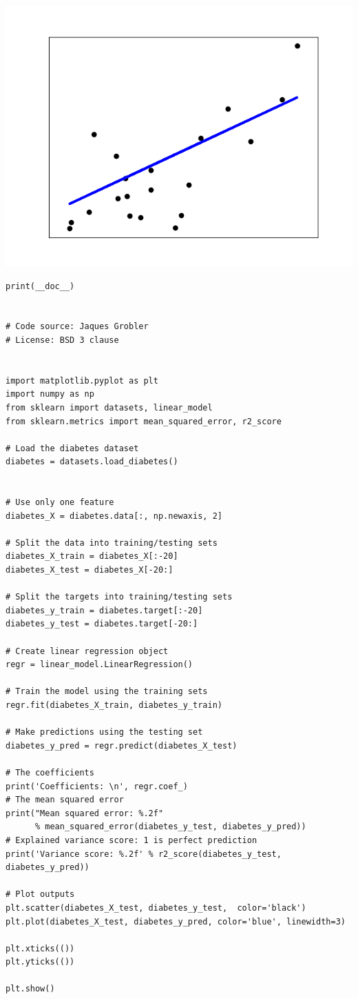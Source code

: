 \begin{itemize}
\begin{center}
  	\includegraphics[scale=0.8]{exemplu2}
\end{center}

\begin{lstlisting}[frame=single]
print(__doc__)


# Code source: Jaques Grobler
# License: BSD 3 clause


import matplotlib.pyplot as plt
import numpy as np
from sklearn import datasets, linear_model
from sklearn.metrics import mean_squared_error, r2_score

# Load the diabetes dataset
diabetes = datasets.load_diabetes()


# Use only one feature
diabetes_X = diabetes.data[:, np.newaxis, 2]

# Split the data into training/testing sets
diabetes_X_train = diabetes_X[:-20]
diabetes_X_test = diabetes_X[-20:]

# Split the targets into training/testing sets
diabetes_y_train = diabetes.target[:-20]
diabetes_y_test = diabetes.target[-20:]

# Create linear regression object
regr = linear_model.LinearRegression()

# Train the model using the training sets
regr.fit(diabetes_X_train, diabetes_y_train)

# Make predictions using the testing set
diabetes_y_pred = regr.predict(diabetes_X_test)

# The coefficients
print('Coefficients: \n', regr.coef_)
# The mean squared error
print("Mean squared error: %.2f"
      % mean_squared_error(diabetes_y_test, diabetes_y_pred))
# Explained variance score: 1 is perfect prediction
print('Variance score: %.2f' % r2_score(diabetes_y_test, diabetes_y_pred))

# Plot outputs
plt.scatter(diabetes_X_test, diabetes_y_test,  color='black')
plt.plot(diabetes_X_test, diabetes_y_pred, color='blue', linewidth=3)

plt.xticks(())
plt.yticks(())

plt.show()
\end{lstlisting}

\end{itemize}